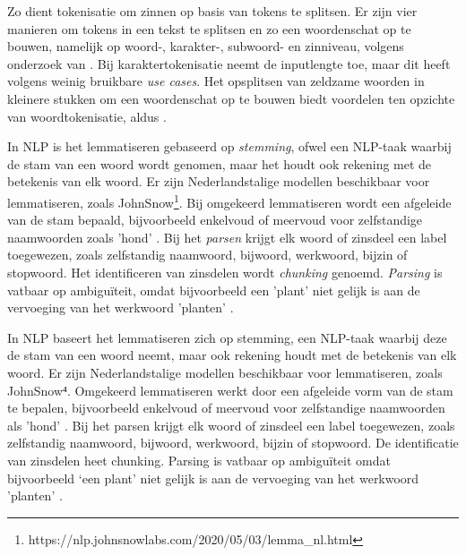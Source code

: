 \medspace

Zo dient tokenisatie om zinnen op basis van tokens te splitsen. Er zijn vier manieren om tokens in een tekst te splitsen en zo een woordenschat op te bouwen, namelijk op woord-, karakter-, subwoord- en zinniveau, volgens onderzoek van \textcite{Menzli2023}. Bij karaktertokenisatie neemt de inputlengte toe, maar dit heeft volgens \textcite{Ribeiro2018} weinig bruikbare \textit{use cases}. Het opsplitsen van zeldzame woorden in kleinere stukken om een woordenschat op te bouwen biedt voordelen ten opzichte van woordtokenisatie, aldus \autocite{Iredale2022}.

\medspace

In NLP is het lemmatiseren gebaseerd op \textit{stemming}, ofwel een NLP-taak waarbij de stam van een woord wordt genomen, maar het houdt ook rekening met de betekenis van elk woord. Er zijn Nederlandstalige modellen beschikbaar voor lemmatiseren, zoals JohnSnow\footnote{https://nlp.johnsnowlabs.com/2020/05/03/lemma\_nl.html}. Bij omgekeerd lemmatiseren wordt een afgeleide van de stam bepaald, bijvoorbeeld enkelvoud of meervoud voor zelfstandige naamwoorden zoals 'hond' \autocite{Eisenstein2019}. Bij het \textit{parsen} krijgt elk woord of zinsdeel een label toegewezen, zoals zelfstandig naamwoord, bijwoord, werkwoord, bijzin of stopwoord. Het identificeren van zinsdelen wordt \textit{chunking} genoemd. \textit{Parsing} is vatbaar op ambiguïteit, omdat bijvoorbeeld een 'plant' niet gelijk is aan de vervoeging van het werkwoord 'planten' \autocite{Eisenstein2019}.

\medspace

In NLP baseert het lemmatiseren zich op stemming, een NLP-taak waarbij deze de stam van een woord neemt, maar ook rekening houdt met de betekenis van elk woord. Er zijn Nederlandstalige modellen beschikbaar voor lemmatiseren, zoals JohnSnow⁴. Omgekeerd lemmatiseren werkt door een afgeleide vorm van de stam te bepalen, bijvoorbeeld enkelvoud of meervoud voor zelfstandige naamwoorden als ’hond’ \autocite{Eisenstein2019}. Bij het parsen krijgt elk woord of zinsdeel een label toegewezen, zoals zelfstandig naamwoord, bijwoord, werkwoord, bijzin of stopwoord. De identificatie van zinsdelen heet chunking. Parsing is vatbaar op ambiguïteit omdat bijvoorbeeld ‘een plant’ niet gelijk is aan de vervoeging van het werkwoord ’planten’ \autocite{Eisenstein2019}.

\medspace

